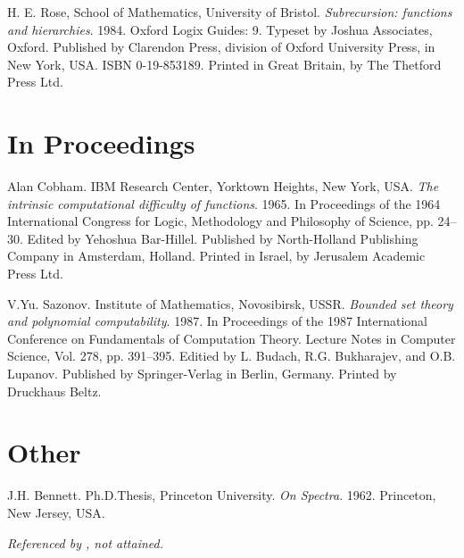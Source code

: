 \begin{thebibliography}{9}

H. E. Rose, School of Mathematics, University of Bristol. \emph{Subrecursion:
functions and hierarchies}. 1984. Oxford Logix Guides: 9. Typeset by Joshua
Associates, Oxford.  Published by Clarendon Press, division of Oxford
University Press, in New York, USA. ISBN 0-19-853189. Printed in Great Britain,
by The Thetford Press Ltd.

\backrefprint

\section*{In Proceedings}


Alan Cobham. IBM Research Center, Yorktown Heights, New York, USA. \emph{The
intrinsic computational difficulty of functions}. 1965. In Proceedings of the
1964 International Congress for Logic, Methodology and Philosophy of Science,
pp. 24--30. Edited by Yehoshua Bar-Hillel. Published by North-Holland
Publishing Company in Amsterdam, Holland.  Printed in Israel, by Jerusalem
Academic Press Ltd.

\backrefprint


V.Yu. Sazonov. Institute of Mathematics, Novosibirsk, USSR. \emph{Bounded set
theory and polynomial computability}. 1987. In Proceedings of the 1987
International Conference on Fundamentals of Computation Theory. Lecture Notes
in Computer Science, Vol. 278, pp. 391--395. Editied by L. Budach, R.G.
Bukharajev, and O.B. Lupanov. Published by Springer-Verlag in Berlin, Germany.
Printed by Druckhaus Beltz.

\backrefprint

\section*{Other}


J.H. Bennett. Ph.D.Thesis, Princeton University. \emph{On Spectra}. 1962.
Princeton, New Jersey, USA.

\emph{Referenced by \cite{cobham-1965}, not attained.}

\backrefprint

\end{thebibliography}
